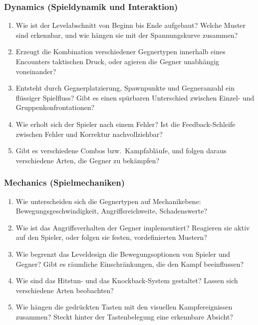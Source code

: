 \documentclass[../Main.tex]{subfiles}
\begin{document}
\subsubsection{Dynamics (Spieldynamik und Interaktion)}

\begin{enumerate}[label=\textbf{D\arabic*}, leftmargin=1.5cm, itemsep=0.5em]
    \item Wie ist der Levelabschnitt von Beginn bis Ende aufgebaut? Welche Muster sind erkennbar, und wie hängen sie mit der Spannungskurve zusammen?
    \item Erzeugt die Kombination verschiedener Gegnertypen innerhalb eines Encounters taktischen Druck, oder agieren die Gegner unabhängig voneinander?
    \item Entsteht durch Gegnerplatzierung, Spawnpunkte und Gegneranzahl ein flüssiger Spielfluss? Gibt es einen spürbaren Unterschied zwischen Einzel- und Gruppenkonfrontationen?
    \item Wie erholt sich der Spieler nach einem Fehler? Ist die Feedback-Schleife zwischen Fehler und Korrektur nachvollziehbar?
    \item Gibt es verschiedene Combos bzw.\ Kampfabläufe, und folgen daraus verschiedene Arten, die Gegner zu bekämpfen?
\end{enumerate}

\subsubsection{Mechanics (Spielmechaniken)}

\begin{enumerate}[label=\textbf{M\arabic*}, leftmargin=1.5cm, itemsep=0.5em]
    \item Wie unterscheiden sich die Gegnertypen auf Mechanikebene: Bewegungsgeschwindigkeit, Angriffsreichweite, Schadenswerte?
    \item Wie ist das Angriffsverhalten der Gegner implementiert? Reagieren sie aktiv auf den Spieler, oder folgen sie festen, vordefinierten Mustern?
    \item Wie begrenzt das Leveldesign die Bewegungsoptionen von Spieler und Gegner? Gibt es räumliche Einschränkungen, die den Kampf beeinflussen?
    \item Wie sind das Hitstun- und das Knockback-System gestaltet? Lassen sich verschiedene Arten beobachten?
    \item Wie hängen die gedrückten Tasten mit den visuellen Kampfereignissen zusammen? Steckt hinter der Tastenbelegung eine erkennbare Absicht?
\end{enumerate}
\end{document}

